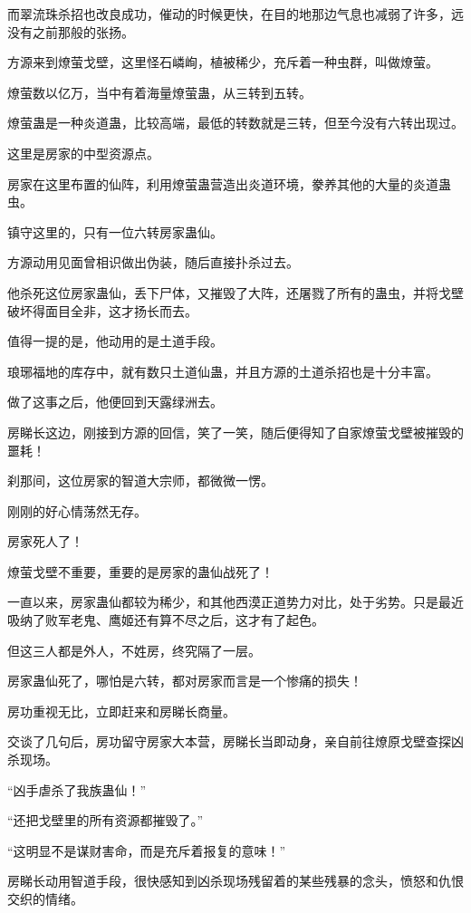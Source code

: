 \begin{this_body}
而翠流珠杀招也改良成功，催动的时候更快，在目的地那边气息也减弱了许多，远没有之前那般的张扬。

方源来到燎萤戈壁，这里怪石嶙峋，植被稀少，充斥着一种虫群，叫做燎萤。

燎萤数以亿万，当中有着海量燎萤蛊，从三转到五转。

燎萤蛊是一种炎道蛊，比较高端，最低的转数就是三转，但至今没有六转出现过。

这里是房家的中型资源点。

房家在这里布置的仙阵，利用燎萤蛊营造出炎道环境，豢养其他的大量的炎道蛊虫。

镇守这里的，只有一位六转房家蛊仙。

方源动用见面曾相识做出伪装，随后直接扑杀过去。

他杀死这位房家蛊仙，丢下尸体，又摧毁了大阵，还屠戮了所有的蛊虫，并将戈壁破坏得面目全非，这才扬长而去。

值得一提的是，他动用的是土道手段。

琅琊福地的库存中，就有数只土道仙蛊，并且方源的土道杀招也是十分丰富。

做了这事之后，他便回到天露绿洲去。

房睇长这边，刚接到方源的回信，笑了一笑，随后便得知了自家燎萤戈壁被摧毁的噩耗！

刹那间，这位房家的智道大宗师，都微微一愣。

刚刚的好心情荡然无存。

房家死人了！

燎萤戈壁不重要，重要的是房家的蛊仙战死了！

一直以来，房家蛊仙都较为稀少，和其他西漠正道势力对比，处于劣势。只是最近吸纳了败军老鬼、鹰姬还有算不尽之后，这才有了起色。

但这三人都是外人，不姓房，终究隔了一层。

房家蛊仙死了，哪怕是六转，都对房家而言是一个惨痛的损失！

房功重视无比，立即赶来和房睇长商量。

交谈了几句后，房功留守房家大本营，房睇长当即动身，亲自前往燎原戈壁查探凶杀现场。

“凶手虐杀了我族蛊仙！”

“还把戈壁里的所有资源都摧毁了。”

“这明显不是谋财害命，而是充斥着报复的意味！”

房睇长动用智道手段，很快感知到凶杀现场残留着的某些残暴的念头，愤怒和仇恨交织的情绪。


\end{this_body}
